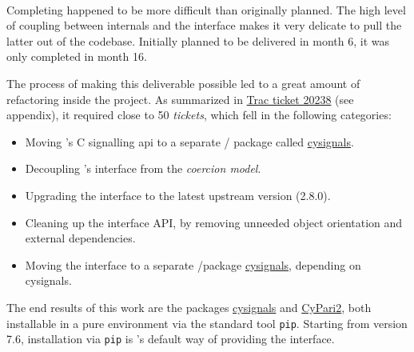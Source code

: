 \documentclass{deliverablereport}
\begin{document}
\paragraph{}

Completing  happened to be more difficult than
originally planned. The high level of coupling between \Sage internals
and the \Pari interface makes it very delicate to pull the latter out
of the \Sage codebase. Initially planned to be delivered in month 6,
it was only completed in month 16.

The process of making this deliverable possible led to a great amount
of refactoring inside the \Sage project. As summarized in
\href{http://trac.sagemath.org/ticket/20238}{Trac ticket 20238} (see
appendix), it required close to 50 \emph{tickets}, which fell in the
following categories:

\begin{itemize}
\tightlist
\item Moving \Sage's C signalling api to a separate \Python/\Cython
  package called
  \href{https://github.com/sagemath/cysignals}{cysignals}.
\item Decoupling \Sage's \Pari interface from the \emph{coercion
    model}.
\item Upgrading the \Pari interface to the latest upstream version
  (2.8.0).
\item Cleaning up the \Pari interface API, by removing unneeded object
  orientation and external dependencies.
\item Moving the \Pari interface to a separate \Python/\Cython package
  \href{https://github.com/sagemath/cysignals}{cysignals}, depending
  on cysignals.
\end{itemize}

The end results of this work are the packages
\href{https://github.com/sagemath/cysignals}{cysignals} and
\href{https://github.com/sagemath/cypari2}{CyPari2}, both installable
in a pure \Python environment via the standard tool
\texttt{pip}. Starting from version 7.6, installation via \texttt{pip}
is \Sage's default way of providing the \Pari interface.


\end{document}
